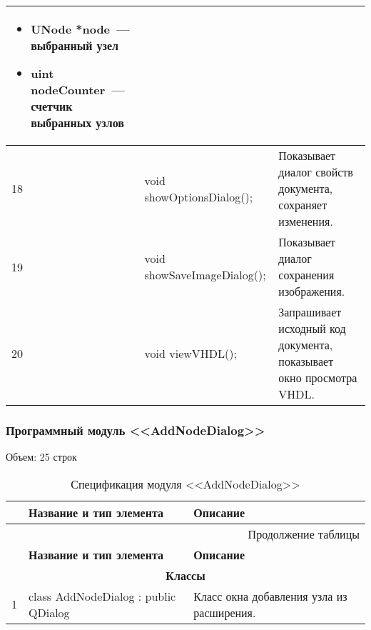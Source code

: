 \begin{longtable}[h]{|p{}|p{}|p{}|}
\begin{itemize}[nolistsep,label=,leftmargin=0cm]
      \item UNode *node~--- выбранный узел
      \item uint nodeCounter~--- счетчик выбранных узлов
    \end{itemize}\\ \hline
  18 & void showOptionsDialog(); & Показывает диалог свойств документа, сохраняет изменения. \\ \hline
  19 & void showSaveImageDialog(); & Показывает диалог сохранения изображения. \\ \hline
  20 & void viewVHDL(); & Запрашивает исходный код документа, показывает окно просмотра VHDL. \\ \hline
\end{longtable}
\normalsize
\onehalfspacing


\subsubsection*{Программный модуль <<AddNodeDialog>>}
Объем: 25 строк

\small
\singlespacing
\begin{longtable}[h]{|p{}|p{}|p{}|}
  \caption{Спецификация модуля <<AddNodeDialog>>}
	\\ \hline
	  \textbf{\No}                  &
	  \textbf{Название и тип элемента}  &
	  \textbf{Описание}
	\\ \hline
  \endfirsthead

  \multicolumn{3}{r}{Продолжение таблицы \thetable{}}
  \\ \hline
	  \textbf{\No}                  &
	  \textbf{Название и тип элемента}  &
	  \textbf{Описание}
	\\ \hline
  \endhead

  \multicolumn{3}{|c|}{\textbf{Классы}} \\
  \hline
  1 & class AddNodeDialog : public QDialog & Класс окна добавления узла из расширения. \\ \hline
\end{longtable}
\normalsize
\onehalfspacing



